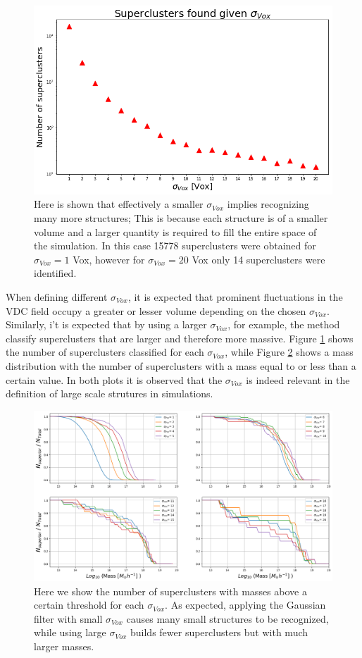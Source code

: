 \begin{figure}[!h]
    \centering
    \includegraphics[width=320pt]{Nclusters.png}
    \caption{Here is shown that effectively a smaller $\sigma_{Vox}$ implies recognizing many more structures; This is because each structure is of a smaller volume and a larger quantity is required to fill the entire space of the simulation. In this case 15778 superclusters were obtained for $\sigma_{Vox}=1$ Vox, however for $\sigma_{Vox}=20$ Vox only 14 superclusters were identified.}
    \label{fig:Nclusters}
\end{figure}

When defining different $\sigma_{Vox}$, it is expected that prominent fluctuations in the VDC field occupy a greater or lesser volume depending on the chosen $\sigma_{Vox}$. Similarly, i't is expected that by using a larger $\sigma_{Vox}$, for example, the method classify superclusters that are larger and therefore more massive. Figure \ref{fig:Nclusters} shows the number of superclusters classified for each $\sigma_{Vox}$, while Figure \ref{fig:masaAcumulada}  shows a mass distribution with the number of superclusters with a mass equal to or less than a certain value. In both plots it is observed that the $\sigma_{Vox}$ is indeed relevant in the definition of large scale strutures in simulations.

\begin{figure}[!h]
    \centering
    \includegraphics[width=420pt]{MasasMayoresnormc.png}
    \caption{Here we show the number of superclusters with masses above a certain threshold for each $\sigma_{Vox}$. As expected, applying the Gaussian filter with small $\sigma_{Vox}$ causes many small structures to be recognized, while using large $\sigma_{Vox}$ builds fewer superclusters but with much larger masses.}
    \label{fig:masaAcumulada}
\end{figure}

